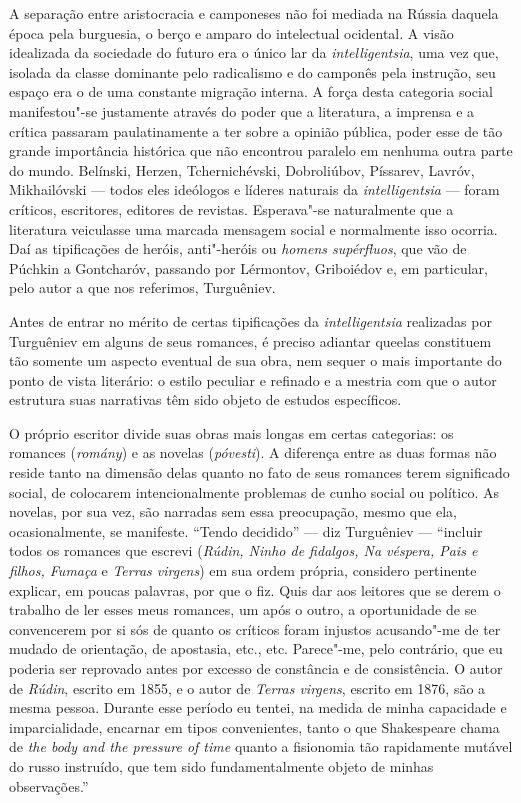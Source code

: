 A separação entre aristocracia e camponeses não foi mediada na Rússia
daquela época pela burguesia, o berço e amparo do intelectual ocidental. A
visão idealizada da sociedade do futuro era o único lar da \emph{intelligentsia}, uma vez que,
isolada da classe dominante pelo radicalismo e do
camponês pela instrução, seu espaço era o de uma constante migração interna. A força desta categoria social manifestou"-se justamente através do poder que a literatura, a imprensa e a crítica passaram paulatinamente a ter sobre a opinião pública, poder esse de tão grande importância histórica que não encontrou paralelo em nenhuma outra parte do mundo. Belínski, Herzen, Tchernichévski, Dobroliúbov, Píssarev, Lavróv, Mikhailóvski --- todos eles ideólogos e líderes naturais da \emph{intelligentsia} --- foram críticos, escritores,
editores de revistas. Esperava"-se naturalmente que a literatura
veiculasse uma marcada mensagem social e normalmente isso ocorria. Daí as tipificações de heróis, anti"-heróis ou \emph{homens supérfluos}, que vão de Púchkin a Gontcharóv, passando por Lérmontov, Griboiédov e, em particular, pelo autor a que nos referimos, Turguêniev.

Antes de entrar no mérito de certas tipificações da \emph{intelligentsia}
realizadas por Turguêniev em alguns de seus romances, é preciso adiantar
queelas constituem tão somente um aspecto eventual de sua obra, nem sequer o mais importante
do ponto de vista literário: o estilo
peculiar e refinado e a mestria com que o autor estrutura suas
narrativas têm sido objeto de estudos específicos.

O próprio escritor divide suas obras mais longas em certas categorias:
os romances (\emph{romány}) e as novelas (\emph{póvesti}). A diferença entre
as duas formas não reside tanto na dimensão delas quanto no fato de
seus romances terem significado social, de colocarem intencionalmente
problemas de cunho social ou político. As novelas, por sua vez, são
narradas sem essa preocupação, mesmo que ela, ocasionalmente, se
manifeste. ``Tendo decidido'' --- diz Turguêniev --- ``incluir todos os
romances que escrevi (\emph{Rúdin, Ninho de fidalgos, Na véspera, Pais e
filhos, Fumaça} e \emph{Terras virgens}) em sua ordem própria, considero
pertinente explicar, em poucas palavras, por que o fiz. Quis dar aos
leitores que se derem o trabalho de ler esses meus romances, um após o
outro, a oportunidade de se convencerem por si sós de quanto os críticos
foram injustos acusando"-me de ter mudado de orientação, de apostasia,
etc., etc. Parece"-me, pelo contrário, que eu poderia ser reprovado antes
por excesso de constância e de consistência. O autor de \emph{Rúdin},
escrito em 1855, e o autor de \emph{Terras virgens}, escrito em 1876,
são a mesma pessoa. Durante esse período eu tentei, na medida de minha
capacidade e imparcialidade, encarnar em tipos convenientes, tanto
o que Shakespeare chama de \emph{the body and the pressure of time}
quanto a fisionomia tão rapidamente mutável do russo instruído, que tem
sido fundamentalmente objeto de minhas observações.''

